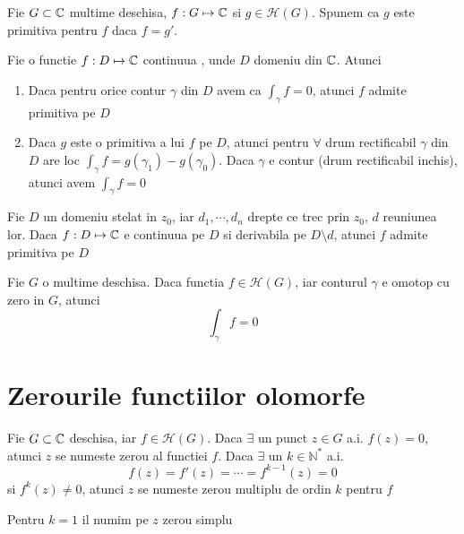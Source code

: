 \begin{definition}
    Fie $G\subset \mathbb{C}$ multime deschisa, $f:G\mapsto \mathbb{C}$ si $g \in \mathcal{H}(G)$. Spunem ca $g$
    este primitiva pentru $f$ daca $f = g'$.
\end{definition}

\begin{theorem}
    Fie o functie $f:D\mapsto \mathbb{C}$ continuua , unde $D$ domeniu din $\mathbb{C}$. Atunci
    \begin{enumerate}
        \item Daca pentru orice contur $\gamma$ din $D$ avem ca $\int_{\gamma} f = 0$, atunci $f$
            admite primitiva pe $D$
        \item Daca $g$ este o primitiva a lui $f$ pe $D$, atunci pentru $\forall$ drum rectificabil
            $\gamma$ din $D$ are loc $\int_{\gamma} f = g(\gamma_1) - g(\gamma_0)$. Daca $\gamma$
            e contur (drum rectificabil inchis), atunci avem $\int_{\gamma} f = 0$
    \end{enumerate}
\end{theorem}

\begin{theorem}
    Fie $D$ un domeniu stelat in $z_0$, iar $d_1, \cdots , d_n$ drepte ce trec prin $z_0$,
    $d$ reuniunea lor. Daca $f:D\mapsto \mathbb{C}$ e continuua pe $D$ si derivabila pe $D\setminus d$,
    atunci $f$ admite primitiva pe $D$
\end{theorem}

\begin{theorem}[Cauchy]
    Fie $G$ o multime deschisa. Daca functia $f\in\mathcal{H}(G)$, iar conturul $\gamma$ e omotop cu zero
     in $G$, atunci
     \[
        \int_{\gamma} f = 0
     \]
\end{theorem}


\section{Zerourile functiilor olomorfe}

\begin{definition}
    Fie $G\subset \mathbb{C}$ deschisa, iar $f \in \mathcal{H}(G)$. Daca $\exists$ un punct $z\in G$ a.i.
    $f(z) = 0$, atunci $z$ se numeste zerou al functiei $f$. Daca $\exists$ un $k\in\mathbb{N}^{*}$
    a.i.
    \[
        f(z) = f'(z) = \cdots = f^{k-1}(z) = 0
    \]
    si $f^{k}(z) \neq 0$, atunci $z$ se numeste zerou multiplu de ordin $k$ pentru $f$

    Pentru $k=1$ il numim pe $z$ zerou simplu
\end{definition}

